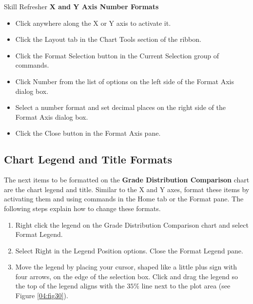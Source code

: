 \begin{center}
	\begin{sklbox}{Skill Refresher}
		\textbf{X and Y Axis Number Formats}
		\\
		\begin{itemize}
			\setlength{\itemsep}{0pt}
			\setlength{\parskip}{0pt}
			\setlength{\parsep}{0pt}

			\item Click anywhere along the X or Y axis to activate it.
			\item Click the Layout tab in the Chart Tools section of the ribbon.
			\item Click the Format Selection button in the Current Selection group of commands.
			\item Click Number from the list of options on the left side of the Format Axis dialog box.
			\item Select a number format and set decimal places on the right side of the Format Axis dialog box.
			\item Click the Close button in the Format Axis pane.
			
		\end{itemize}
	\end{sklbox}
\end{center}

\subsection{Chart Legend and Title Formats}

The next items to be formatted on the \textbf{Grade Distribution Comparison} chart are the chart legend and title. Similar to the X and Y axes, format these items by activating them and using commands in the Home tab or the Format pane. The following steps explain how to change these formats.

\begin{enumerate}
	\item Right click the legend on the Grade Distribution Comparison chart and select Format Legend.
	\item Select Right in the Legend Position options. Close the Format Legend pane.
	\item Move the legend by placing your cursor, shaped like a little plus sign with four arrows, on the edge of the selection box. Click and drag the legend so the top of the legend aligns with the $ 35\% $ line next to the plot area (see Figure \ref{04:fig30}).
\end{enumerate}

